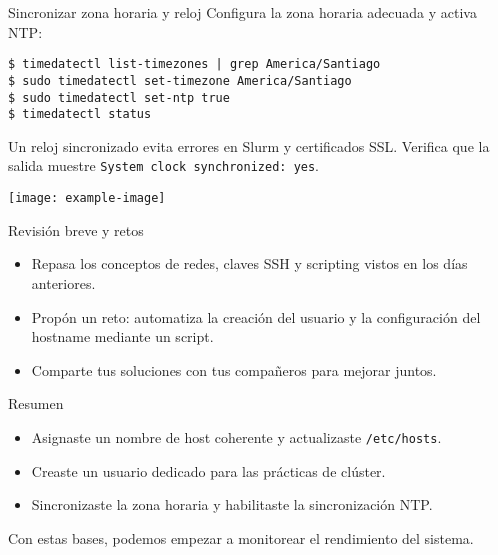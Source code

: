 \documentclass[aspectratio=169,professionalfonts]{beamer}
\begin{document}
\begin{frame}[fragile]{Sincronizar zona horaria y reloj}
  Configura la zona horaria adecuada y activa NTP:
  \begin{verbatim}
$ timedatectl list-timezones | grep America/Santiago
$ sudo timedatectl set-timezone America/Santiago
$ sudo timedatectl set-ntp true
$ timedatectl status
  \end{verbatim}
  \begin{infobox}
  Un reloj sincronizado evita errores en Slurm y certificados SSL. Verifica que la salida muestre \texttt{System clock synchronized: yes}.
  \end{infobox}
  \begin{center}
    \texttt{[image: example-image]}
  \end{center}
\end{frame}

\begin{frame}[fragile]{Revisión breve y retos}
  \begin{itemize}
    \item Repasa los conceptos de redes, claves SSH y scripting vistos en los días anteriores.
    \item Propón un reto: automatiza la creación del usuario y la configuración del hostname mediante un script.
    \item Comparte tus soluciones con tus compañeros para mejorar juntos.
  \end{itemize}
\end{frame}

\begin{frame}[fragile]{Resumen}
  \begin{itemize}
    \item Asignaste un nombre de host coherente y actualizaste \texttt{/etc/hosts}.
    \item Creaste un usuario dedicado para las prácticas de clúster.
    \item Sincronizaste la zona horaria y habilitaste la sincronización NTP.
  \end{itemize}
  \vspace{0.5em}
  Con estas bases, podemos empezar a monitorear el rendimiento del sistema.
\end{frame}
\end{document}
